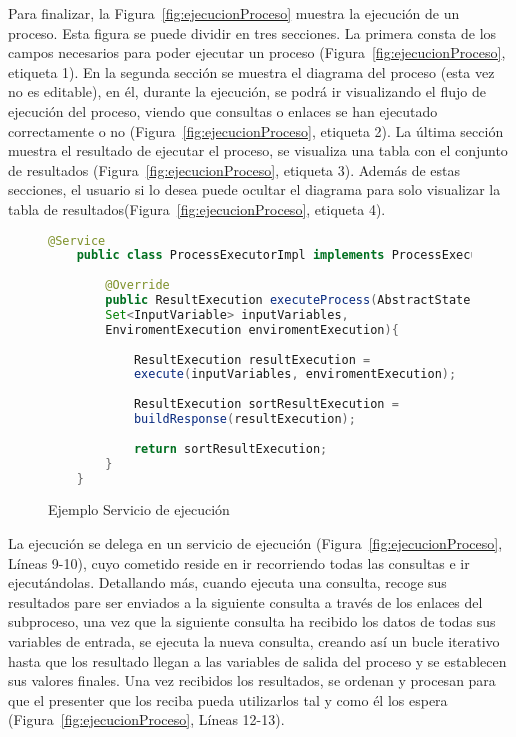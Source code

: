 Para finalizar, la Figura~\ref{fig:ejecucionProceso} muestra la ejecución de un proceso. Esta figura se puede dividir en tres secciones. La primera consta de los campos necesarios para poder ejecutar un proceso (Figura~\ref{fig:ejecucionProceso}, etiqueta 1). En la segunda sección se muestra el diagrama del proceso (esta vez no es editable), en él, durante la ejecución, se podrá ir visualizando el flujo de ejecución del proceso, viendo que consultas o enlaces se han ejecutado correctamente o no (Figura~\ref{fig:ejecucionProceso}, etiqueta 2). La última sección muestra el resultado de ejecutar el proceso, se visualiza una tabla con el conjunto de resultados (Figura~\ref{fig:ejecucionProceso}, etiqueta 3). Además de estas secciones, el usuario si lo desea puede ocultar el diagrama para solo visualizar la tabla de resultados(Figura~\ref{fig:ejecucionProceso}, etiqueta 4).

\begin{figure}[H]
	\centering
	\begin{lstlisting}[language=Java]
	@Service
	public class ProcessExecutorImpl implements ProcessExecutor{
	
		@Override
		public ResultExecution executeProcess(AbstractState state, 
		Set<InputVariable> inputVariables, 
		EnviromentExecution enviromentExecution){
		
			ResultExecution resultExecution = 
			execute(inputVariables, enviromentExecution);
			
			ResultExecution sortResultExecution = 
			buildResponse(resultExecution);
			
			return sortResultExecution;
		}
	}\end{lstlisting}
	\caption{Ejemplo Servicio de ejecución}
	\label{fig:executionExample}
\end{figure}

La ejecución se delega en un servicio de ejecución (Figura~\ref{fig:ejecucionProceso}, Líneas 9-10), cuyo cometido reside en ir recorriendo todas las consultas e ir ejecutándolas. Detallando más, cuando ejecuta una consulta, recoge sus resultados pare ser enviados a la siguiente consulta a través de los enlaces del subproceso, una vez que la siguiente consulta ha recibido los datos de todas sus variables de entrada, se ejecuta la nueva consulta, creando así un bucle iterativo hasta que los resultado llegan a las variables de salida del proceso y se establecen sus valores finales. Una vez recibidos los resultados, se ordenan y procesan para que el presenter que los reciba pueda utilizarlos tal y como él los espera (Figura~\ref{fig:ejecucionProceso}, Líneas 12-13).




